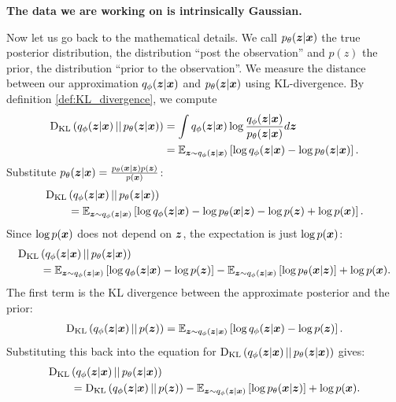 \textbf{The data we are working on is intrinsically Gaussian.}

Now let us go back to the mathematical details. We call $p_{\theta}(\vz|\vx)$
the true posterior distribution, the distribution ``post the observation'' and
$p(z)$ the prior, the distribution ``prior to the observation''. We measure the
distance between our approximation $q_{\phi}(\vz|\vx)$ and
$p_{\theta}(\vz|\vx)$ using KL-divergence. By definition
\ref{def:KL_divergence}, we compute
\begin{align}
    \KL{q_{\phi}(\vz|\vx)}{p_{\theta}(\vz|\vx)} & = \int q_{\phi}(\vz|\vx) \log \frac{q_{\phi}(\vz|\vx)}{p_{\theta}(\vz|\vx)} d\vz                    \\
                                                & = \e_{\vz \sim q_{\phi}(\vz|\vx)} \left[ \log q_{\phi}(\vz|\vx) - \log p_{\theta}(\vz|\vx) \right].
\end{align}
Substitute $p_{\theta}(\vz|\vx) = \frac{p_{\theta}(\vx|\vz) p(\vz)}{p(\vx)}$:
\begin{align}
     & \KL{q_{\phi}(\vz|\vx)}{p_{\theta}(\vz|\vx)} \nonumber                                                                                       \\
     & \quad \quad = \e_{\vz \sim q_{\phi}(\vz|\vx)} \left[ \log q_{\phi}(\vz|\vx) - \log p_{\theta}(\vx|\vz) - \log p(\vz) + \log p(\vx) \right].
\end{align}
Since $\log p(\vx)$ does not depend on $\vz$, the expectation is just $\log p(\vx)$:
\begin{align}
     & \KL{q_{\phi}(\vz|\vx)}{p_{\theta}(\vz|\vx)} \nonumber                                                                                                                                      \\
     & \quad \quad = \e_{\vz \sim q_{\phi}(\vz|\vx)} \left[ \log q_{\phi}(\vz|\vx) - \log p(\vz) \right] - \e_{\vz \sim q_{\phi}(\vz|\vx)} \left[ \log p_{\theta}(\vx|\vz) \right] + \log p(\vx).
\end{align}
The first term is the KL divergence between the approximate posterior and the prior:
\begin{align}
    \KL{q_{\phi}(\vz|\vx)}{p(\vz)} = \e_{\vz \sim q_{\phi}(\vz|\vx)} \left[ \log q_{\phi}(\vz|\vx) - \log p(\vz) \right].
\end{align}
Substituting this back into the equation for $\KL{q_{\phi}(\vz|\vx)}{p_{\theta}(\vz|\vx)}$ gives:
\begin{align}
     & \KL{q_{\phi}(\vz|\vx)}{p_{\theta}(\vz|\vx)} \nonumber                                                                                 \\
     & \quad \quad = \KL{q_{\phi}(\vz|\vx)}{p(\vz)} - \e_{\vz \sim q_{\phi}(\vz|\vx)} \left[ \log p_{\theta}(\vx|\vz) \right] + \log p(\vx).
\end{align}
